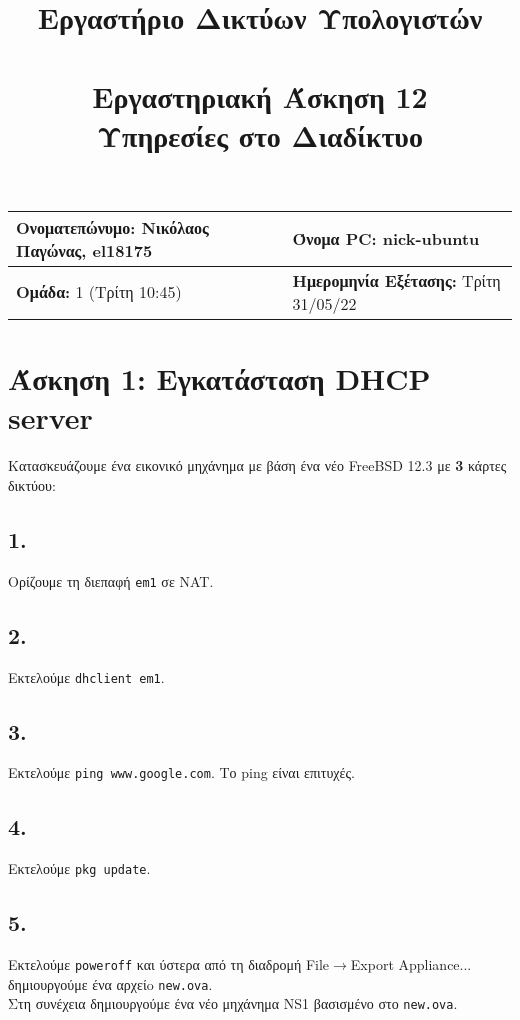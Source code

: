 \documentclass[a4paper, 12pt]{article}
\title{
	\textbf{Εργαστήριο Δικτύων Υπολογιστών} \\~\\
	Εργαστηριακή Άσκηση 12 \\ 
	Υπηρεσίες στο Διαδίκτυο	
}
\author{}
\date{}
\begin{document}
\maketitle
\begin{center}
	\begin{tabular}{|l|l|}
		\hline
		\textbf{Ονοματεπώνυμο:} Νικόλαος Παγώνας, el18175  & \textbf{Όνομα PC:} nick-ubuntu \\
		\hline
		\textbf{Ομάδα:} 1 (Τρίτη 10:45) & \textbf{Ημερομηνία Εξέτασης:} Τρίτη 31/05/22 \\
		\hline
	\end{tabular}
\end{center}

\section*{Άσκηση 1: Εγκατάσταση DHCP server}
	
	Κατασκευάζουμε ένα εικονικό μηχάνημα με βάση ένα νέο FreeBSD 12.3 με \textbf{3} κάρτες δικτύου:
	
	\subsection*{1.}
		Ορίζουμε τη διεπαφή \verb|em1| σε NAT.
	
	\subsection*{2.}
		Εκτελούμε \verb|dhclient em1|.
	
	\subsection*{3.}
		Εκτελούμε \verb|ping www.google.com|. Το ping είναι επιτυχές.
	
	\subsection*{4.}
		Εκτελούμε \verb|pkg update|. 
	
	\subsection*{5.}
		Εκτελούμε \verb|poweroff| και ύστερα από τη διαδρομή File$\rightarrow$Export Appliance... δημιουργούμε ένα αρχείo \verb|new.ova|. \\
		
	Στη συνέχεια δημιουργούμε ένα νέο μηχάνημα NS1 βασισμένο στο \verb|new.ova|. 
	
\end{document}
